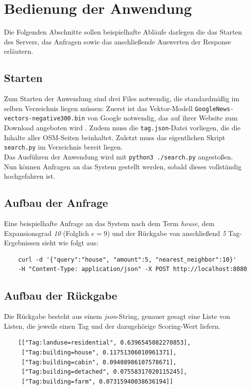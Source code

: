 \documentclass[12pt,pdftex,a4paper]{article}
\begin{document}
\section{Bedienung der Anwendung}
Die Folgenden Abschnitte sollen beispielhafte Abläufe darlegen die das Starten des Servers, das Anfragen sowie das anschließende Auswerten der Response erläutern.

\subsection{Starten}
Zum Starten der Anwendung sind drei Files notwendig, die standardmäßig im selben Verzeichnis liegen müssen: Zuerst ist das Vektor-Modell \texttt{GoogleNews-vectors-negative300.bin} von Google notwendig, das auf ihrer Website zum Download angeboten wird \cite{googleword2vec}. Zudem muss die  \texttt{tag.json}-Datei vorliegen, die die Inhalte aller OSM-Seiten beinhaltet. Zuletzt muss das eigentlichen Skript  \texttt{search.py} im Verzeichnis bereit liegen.\\
Das Ausführen der Anwendung wird mit \texttt{python3 ./search.py} angestoßen.\\
Nun können Anfragen an das System gestellt werden, sobald dieses vollständig hochgefahren ist.


\subsection{Aufbau der Anfrage}
Eine beispielhafte Anfrage an das System nach dem Term \textit{house}, dem Expansionsgrad \textit{10} (Folglich $e=9$) und der Rückgabe  von anschließend \textit{5} Tag-Ergebnissen sieht wie folgt aus:
\begin{lstlisting}
	curl -d '{"query":"house", "amount":5, "nearest_neighbor":10}' 
	-H "Content-Type: application/json" -X POST http://localhost:8080
\end{lstlisting}


\subsection{Aufbau der Rückgabe}
Die Rückgabe besteht aus einem \textit{json}-String, genauer gesagt eine Liste von Listen, die jeweils einen Tag und der dazugehörige Scoring-Wert liefern.
\begin{lstlisting}
	[["Tag:landuse=residential", 0.6396545082270853], 
	 ["Tag:building=house", 0.11751306010961371], 
	 ["Tag:building=cabin", 0.09408986107578671], 
	 ["Tag:building=detached", 0.07558317020115245], 
	 ["Tag:building=farm", 0.07315940038636194]]
\end{lstlisting}
\end{document}
